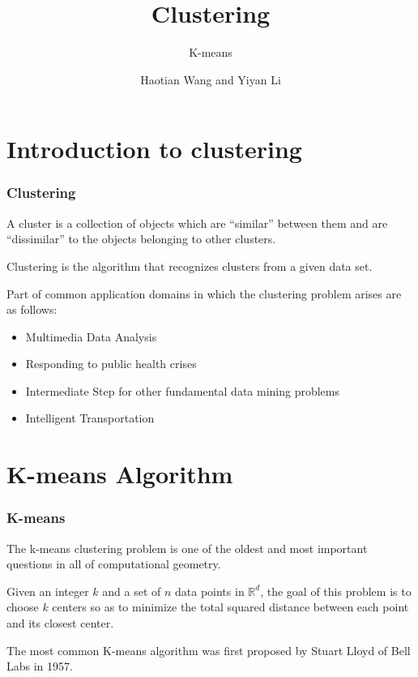 \documentclass[9pt]{beamer}
\newcommand{\ccp}[1]{{\color{purple}#1}}
\begin{document}

\title{Clustering}
\subtitle{K-means}
\author{Haotian Wang and Yiyan Li}
\date{\hspace{2em}}
\frame{
	\titlepage
}
\section{Introduction to clustering}
\begin{frame}
	\frametitle{Clustering}
	\begin{definition}
		A cluster is a collection of objects which are “similar” between them and are “dissimilar” to the objects belonging to other clusters.
	\end{definition}
	\begin{definition}
		Clustering is the algorithm that recognizes clusters from a given data set.
	\end{definition}
	\pause
	Part of common application domains in which the clustering problem arises are as follows:
	\begin{itemize}
		\item Multimedia Data Analysis
		\item Responding to public health crises
		\item Intermediate Step for other fundamental data mining problems
		\item Intelligent Transportation
	\end{itemize}
\end{frame}

\section{K-means Algorithm}
\begin{frame}
	\frametitle{K-means}
	The \ccp{k-means clustering} problem is one of the oldest and most important questions in all of computational geometry. 
	\par Given an integer $k$ and a set of $n$ data points in $\mathbb{R}^{d}$, the goal of this problem is to choose \ccp{$k$ centers} so as to \ccp{minimize the total squared distance between each point and its closest center}.
	\par The most common K-means algorithm was first proposed by \ccp{Stuart Lloyd} of Bell Labs in 1957.

\end{frame}
\end{document}
